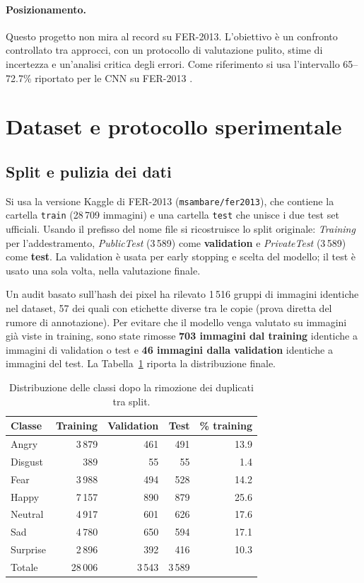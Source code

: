 \documentclass[11pt,a4paper]{article}
\begin{document}
\paragraph{Posizionamento.} Questo progetto non mira al record su FER-2013. L'obiettivo è un confronto controllato tra approcci, con un protocollo di valutazione pulito, stime di incertezza e un'analisi critica degli errori. Come riferimento si usa l'intervallo 65--72.7\% riportato per le CNN su FER-2013 \cite{khaireddin2021fer}.

\section{Dataset e protocollo sperimentale}
\subsection{Split e pulizia dei dati}
Si usa la versione Kaggle di FER-2013 (\texttt{msambare/fer2013}), che contiene la cartella \texttt{train} (28\,709 immagini) e una cartella \texttt{test} che unisce i due test set ufficiali. Usando il prefisso del nome file si ricostruisce lo split originale: \textit{Training} per l'addestramento, \textit{PublicTest} (3\,589) come \textbf{validation} e \textit{PrivateTest} (3\,589) come \textbf{test}. La validation è usata per early stopping e scelta del modello; il test è usato una sola volta, nella valutazione finale.

Un audit basato sull'hash dei pixel ha rilevato 1\,516 gruppi di immagini identiche nel dataset, 57 dei quali con etichette diverse tra le copie (prova diretta del rumore di annotazione). Per evitare che il modello venga valutato su immagini già viste in training, sono state rimosse \textbf{703 immagini dal training} identiche a immagini di validation o test e \textbf{46 immagini dalla validation} identiche a immagini del test. La Tabella~\ref{tab:data} riporta la distribuzione finale.

\begin{table}[H]
\centering
\caption{Distribuzione delle classi dopo la rimozione dei duplicati tra split.}
\label{tab:data}
\begin{tabular}{lrrrr}
\toprule
Classe & Training & Validation & Test & \% training \\
\midrule
Angry    & 3\,879 & 461 & 491 & 13.9 \\
Disgust  &    389 &  55 &  55 &  1.4 \\
Fear     & 3\,988 & 494 & 528 & 14.2 \\
Happy    & 7\,157 & 890 & 879 & 25.6 \\
Neutral  & 4\,917 & 601 & 626 & 17.6 \\
Sad      & 4\,780 & 650 & 594 & 17.1 \\
Surprise & 2\,896 & 392 & 416 & 10.3 \\
\midrule
Totale   & 28\,006 & 3\,543 & 3\,589 & \\
\bottomrule
\end{tabular}
\end{table}
\end{document}
